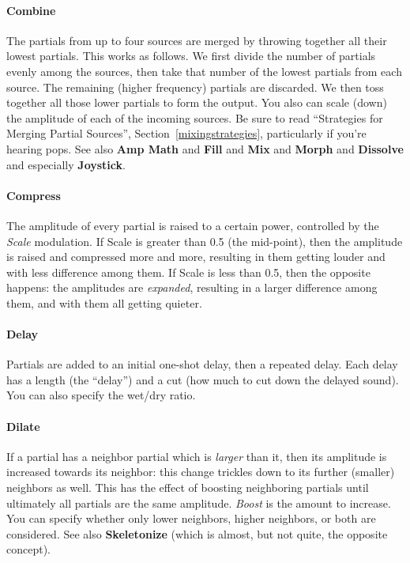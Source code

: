 \documentclass{article}
\begin{document}
\paragraph{Combine} The partials from up to four sources are merged by throwing together all their lowest partials.  This works as follows.  We first divide the number of partials evenly among the sources, then take that number of the lowest partials from each source.  The remaining (higher frequency) partials are discarded.  We then toss together all those lower partials to form the output.  You also can scale (down) the amplitude of each of the incoming sources.  Be sure to read ``Strategies for Merging Partial Sources'', Section~\ref{mixingstrategies}, particularly if you're hearing pops.  See also {\bf Amp Math} and {\bf Fill} and {\bf Mix} and {\bf Morph} and {\bf Dissolve} and especially {\bf Joystick}.

\paragraph{Compress}  The amplitude of every partial is raised to a certain power, controlled by the {\it Scale} modulation.  If Scale is greater than 0.5 (the mid-point), then the amplitude is raised and compressed more and more, resulting in them getting louder and with less difference among them.  If Scale is less than 0.5, then the opposite happens: the amplitudes are {\it expanded}, resulting in a larger difference among them, and with them all getting quieter.

\paragraph{Delay}  Partials are added to an initial one-shot delay, then a repeated delay.  Each delay has a length (the ``delay'') and a cut (how much to cut down the delayed sound).  You can also specify the wet/dry ratio.

\paragraph{Dilate} If a partial has a neighbor partial which is {\it larger} than it, then its amplitude is increased towards its neighbor: this change trickles down to its further (smaller) neighbors as well.  This has the effect of boosting neighboring partials until ultimately all partials are the same amplitude.  {\it Boost} is the amount to increase.  You can specify whether only lower neighbors, higher neighbors, or both are considered.  See also {\bf Skeletonize} (which is almost, but not quite, the opposite concept).
\end{document}
